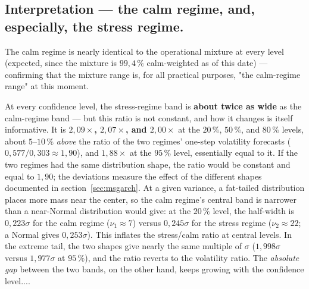 \documentclass[12pt,a4paper]{article}
\begin{document}
\vspace{0.3cm}

\subsection{Interpretation --- the calm regime, and, especially, the stress regime.}

\begin{econbox}
	The calm regime is nearly identical to the operational mixture
	at every level (expected, since the mixture is $99{,}4\,\%$
	calm-weighted as of this date) --- confirming that the mixture
	range is, for all practical purposes, "the calm-regime range" at this
	moment.
\end{econbox} 

\vspace{0.2cm}

\begin{econbox}
	At every confidence level, the
	stress-regime band is \textbf{about twice as wide} as
	the calm-regime band --- but this ratio is not constant, and
	how it changes is itself informative. It is
	\textbf{$2{,}09\times$, $2{,}07\times$, and $2{,}00\times$} at the
	$20\,\%$, $50\,\%$, and $80\,\%$ levels, about $5$--$10\,\%$
	\emph{above} the ratio of the two regimes' one-step volatility
	forecasts ($0{,}577/0{,}303 \approx 1{,}90$), and \textbf{$1{,}88\times$} at
	the $95\,\%$ level, essentially equal to it. If the two regimes
	had the same distribution shape, the ratio would be constant and equal
	to $1{,}90$; the deviations measure the effect of the different
	shapes documented in section~\ref{sec:msgarch}. At a given variance, a
	fat-tailed distribution places more mass near the center,
	so the calm regime's central band is narrower than
	a near-Normal distribution would give: at the $20\,\%$
	level, the half-width is $0{,}223\sigma$ for the calm regime ($\nu_1
	\approx 7$) versus $0{,}245\sigma$ for the stress regime ($\nu_2
	\approx 22$; a Normal gives $0{,}253\sigma$). This inflates the
	stress/calm ratio at central levels. In the extreme tail, the two
	shapes give nearly the same multiple of $\sigma$ ($1{,}998\sigma$
	versus $1{,}977\sigma$ at $95\,\%$), and the ratio reverts to the
	volatility ratio. The \emph{absolute gap} between the two bands, on the
	other hand, keeps growing with the confidence level....
\end{econbox}


\vspace{0.2cm}
\end{document}
